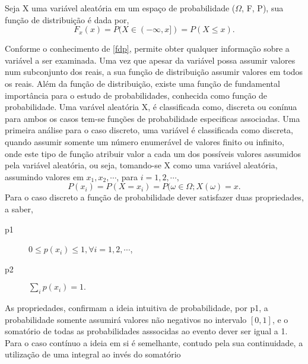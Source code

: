   \begin{defin}
	Seja X uma vari\'{a}vel aleat\'{o}ria em um espa\c{c}o de probabilidade ($\Omega$, F, P), sua fun\c{c}\~{a}o de distribui\c{c}\~{a}o
	\'{e} dada por,
	\begin{equation*}
	F_{x} (x) = P( X \in (-\infty, x]) = P(X \leq x). 
	\end{equation*}
	\label{fdp}
  \end{defin}
  Conforme  \cite{magalhaes} o conhecimento de \ref{fdp}, permite obter qualquer informa\c{c}\~{a}o sobre a vari\'{a}vel a ser examinada.
   Uma vez que apesar da vari\'{a}vel possa assumir valores num subconjunto dos reais, a sua fun\c{c}\~{a}o de distribui\c{c}\~{a}o 
   assumir valores em todos os reais. Al\'{e}m da fun\c{c}\~{a}o de distribui\c{c}\~{a}o, existe uma fun\c{c}\~{a}o de fundamental
   import\^{a}ncia para o estudo de probabilidades, conhecida como fun\c{c}\~{a}o de probabilidade. Uma var\'{a}vel aleat\'{o}ria X, 
   \'{e} classificada como, discreta ou con\'{i}nua para ambos os casos tem-se fun\c{c}\~{o}es de probabilidade especificas associadas.
   Uma primeira an\'{a}lise para o caso discreto, uma vari\'{a}vel \'{e} classificada como discreta, quando assumir somente um n\'{u}mero
   enumer\'{a}vel de valores finito ou infinito, onde este tipo de fun\c{c}\~{a}o atribuir valor a cada um dos poss\'{i}veis valores
   assumidos pela vari\'{a}vel aleat\'{o}ria, ou seja, tomando-se X como uma vari\'{a}vel aleat\'{o}ria, assumindo valores em 
   $x_1, x_2, \cdots $, para $i = 1,2, \cdots,$
   \begin{equation*}
	 P(x_i) = P(X = x_i) = P(\omega \in \Omega; X(\omega) = x.
   \end{equation*}
   Para o caso discreto a fun\c{c}\~{a}o de probabilidade dever satisfazer duas propriedades, a saber,
   \begin{description}
	 \item [p1] $ 0 \leq p(x_i) \leq 1, \forall i = 1,2, \cdots $,
	 \item [p2] $ \sum _i p(x_i) = 1.$
   \end{description}
   As propriedades, confirmam a ideia intuitiva de probabilidade, por p1, a probabilidade somente assumir\'{a} valores n\~{a}o negativos
   no intervalo $[0,1]$, e o somat\'{o}rio de todas as probabilidades asssocidas ao evento dever ser igual a 1. Para o caso cont\'{i}nuo
   a ideia em si \'{e} semelhante, contudo pela sua continuidade, a utiliza\c{c}\~{a}o de uma integral ao inv\'{e}s do somat\'{o}rio
